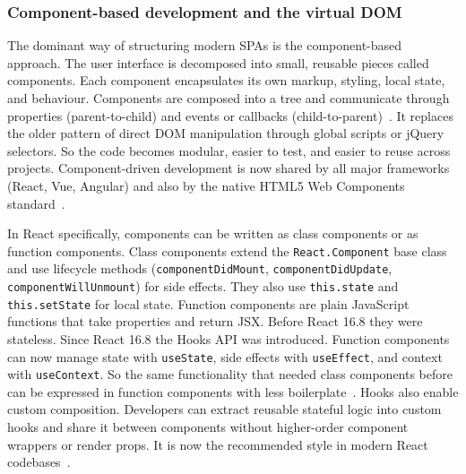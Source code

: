 \subsubsection{Component-based development and the virtual DOM}
\label{subsec:component_vdom}

The dominant way of structuring modern SPAs is the component-based approach. The user interface is decomposed into small, reusable pieces called components. Each component encapsulates its own markup, styling, local state, and behaviour. Components are composed into a tree and communicate through properties (parent-to-child) and events or callbacks (child-to-parent)~\cite{jain2024cdd}. It replaces the older pattern of direct DOM manipulation through global scripts or jQuery selectors. So the code becomes modular, easier to test, and easier to reuse across projects. Component-driven development is now shared by all major frameworks (React, Vue, Angular) and also by the native HTML5 Web Components standard~\cite{jain2024cdd, shah2023webcomponents}.

In React specifically, components can be written as class components or as function components. Class components extend the \texttt{React.Component} base class and use lifecycle methods (\texttt{componentDidMount}, \texttt{componentDidUpdate}, \texttt{componentWillUnmount}) for side effects. They also use \texttt{this.state} and \texttt{this.setState} for local state. Function components are plain JavaScript functions that take properties and return JSX. Before React 16.8 they were stateless. Since React 16.8 the Hooks API was introduced. Function components can now manage state with \texttt{useState}, side effects with \texttt{useEffect}, and context with \texttt{useContext}. So the same functionality that needed class components before can be expressed in function components with less boilerplate~\cite{goli2019react_hooks}. Hooks also enable custom composition. Developers can extract reusable stateful logic into custom hooks and share it between components without higher-order component wrappers or render props. It is now the recommended style in modern React codebases~\cite{goli2019react_hooks, jain2024cdd}.

